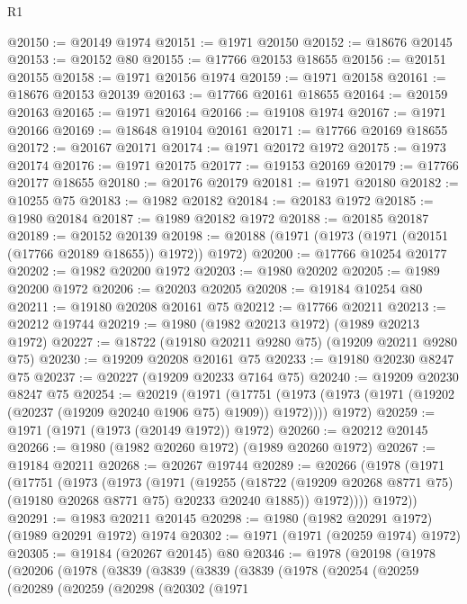 \begin{lexlean}{R1}
\begin{coremodule}
@20150 := @20149 @1974
@20151 := @1971 @20150
@20152 := @18676 @20145
@20153 := @20152 @80
@20155 := @17766 @20153 @18655
@20156 := @20151 @20155
@20158 := @1971 @20156 @1974
@20159 := @1971 @20158
@20161 := @18676 @20153 @20139
@20163 := @17766 @20161 @18655
@20164 := @20159 @20163
@20165 := @1971 @20164
@20166 := @19108 @1974
@20167 := @1971 @20166
@20169 := @18648 @19104 @20161
@20171 := @17766 @20169 @18655
@20172 := @20167 @20171
@20174 := @1971 @20172 @1972
@20175 := @1973 @20174
@20176 := @1971 @20175
@20177 := @19153 @20169
@20179 := @17766 @20177 @18655
@20180 := @20176 @20179
@20181 := @1971 @20180
@20182 := @10255 @75
@20183 := @1982 @20182
@20184 := @20183 @1972
@20185 := @1980 @20184
@20187 := @1989 @20182 @1972
@20188 := @20185 @20187
@20189 := @20152 @20139
@20198 := @20188 (@1971 (@1973 (@1971 (@20151 (@17766 @20189 @18655)) @1972)) @1972)
@20200 := @17766 @10254 @20177
@20202 := @1982 @20200 @1972
@20203 := @1980 @20202
@20205 := @1989 @20200 @1972
@20206 := @20203 @20205
@20208 := @19184 @10254 @80
@20211 := @19180 @20208 @20161 @75
@20212 := @17766 @20211
@20213 := @20212 @19744
@20219 := @1980 (@1982 @20213 @1972) (@1989 @20213 @1972)
@20227 := @18722 (@19180 @20211 @9280 @75) (@19209 @20211 @9280 @75)
@20230 := @19209 @20208 @20161 @75
@20233 := @19180 @20230 @8247 @75
@20237 := @20227 (@19209 @20233 @7164 @75)
@20240 := @19209 @20230 @8247 @75
@20254 := @20219
    (@1971
      (@17751 (@1973 (@1973 (@1971 (@19202 (@20237 (@19209 @20240 @1906 @75) @1909)) @1972))))
      @1972)
@20259 := @1971 (@1971 (@1973 (@20149 @1972)) @1972)
@20260 := @20212 @20145
@20266 := @1980 (@1982 @20260 @1972) (@1989 @20260 @1972)
@20267 := @19184 @20211
@20268 := @20267 @19744
@20289 := @20266
    (@1978
      (@1971
        (@17751
          (@1973
            (@1973
              (@1971
                (@19255
                  (@18722 (@19209 @20268 @8771 @75) (@19180 @20268 @8771 @75) @20233 @20240 @1885))
                @1972))))
        @1972))
@20291 := @1983 @20211 @20145
@20298 := @1980 (@1982 @20291 @1972) (@1989 @20291 @1972) @1974
@20302 := @1971 (@1971 (@20259 @1974) @1972)
@20305 := @19184 (@20267 @20145) @80
@20346 := @1978
    (@20198
      (@1978
        (@20206
          (@1978
            (@3839
              (@3839
                (@3839
                  (@3839
                    (@1978
                      (@20254
                        (@20259
                          (@20289
                            (@20259
                              (@20298
                                (@20302
                                  (@1971

\end{coremodule}
\end{lexlean}
